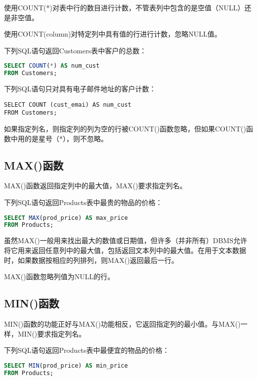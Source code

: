 \begin{compactitem}
\item 使用COUNT(*)对表中行的数目进行计数，不管表列中包含的是空值（NULL）还是非空值。
\item 使用COUNT(column)对特定列中具有值的行进行计数，忽略NULL值。
\end{compactitem}


下列SQL语句返回Customers表中客户的总数：

\begin{lstlisting}[language=SQL]
SELECT COUNT(*) AS num_cust
FROM Customers;
\end{lstlisting}

下列SQL语句只对具有电子邮件地址的客户计数：

\begin{lstlisting}
SELECT COUNT (cust_emai) AS num_cust
FROM Customers;
\end{lstlisting}

如果指定列名，则指定列的列为空的行被COUNT()函数忽略，但如果COUNT()函数中用的是星号（*），则不忽略。
\subsection{MAX()函数}

MAX()函数返回指定列中的最大值，MAX()要求指定列名。

下列SQL语句返回Products表中最贵的物品的价格：

\begin{lstlisting}[language=SQL]
SELECT MAX(prod_price) AS max_price
FROM Products;
\end{lstlisting}

虽然MAX()一般用来找出最大的数值或日期值，但许多（并非所有）DBMS允许将它用来返回任意列中的最大值，包括返回文本列中的最大值。在用于文本数据时，如果数据按相应的列排列，则MAX()返回最后一行。

MAX()函数忽略列值为NULL的行。
\subsection{MIN()函数}

MIN()函数的功能正好与MAX()功能相反，它返回指定列的最小值。与MAX()一样，MIN()要求指定列名。

下列SQL语句返回Products表中最便宜的物品的价格：

\begin{lstlisting}[language=SQL]
SELECT MIN(prod_price) AS min_price
FROM Products;
\end{lstlisting}

